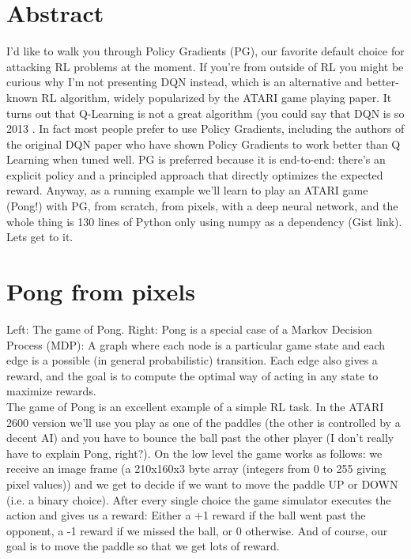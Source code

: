 \documentclass[14pt,a4paper]{report}  %
\begin{document}
\section{Abstract}
\qquad I'd like to walk you through Policy Gradients (PG), our favorite default choice for attacking RL problems at the moment. If you’re from outside of RL you might be curious why I’m not presenting DQN instead, which is an alternative and better-known RL algorithm, widely popularized by the ATARI game playing paper. It turns out that Q-Learning is not a great algorithm (you could say that DQN is so 2013 . In fact most people prefer to use Policy Gradients, including the authors of the original DQN paper who have shown Policy Gradients to work better than Q Learning when tuned well. PG is preferred because it is end-to-end: there's an explicit policy and a principled approach that directly optimizes the expected reward. Anyway, as a running example we'll learn to play an ATARI game (Pong!) with PG, from scratch, from pixels, with a deep neural network, and the whole thing is 130 lines of Python only using numpy as a dependency (Gist link). Lets get to it.

\section{Pong from pixels}
\qquad Left: The game of Pong. Right: Pong is a special case of a Markov Decision Process (MDP): A graph where each node is a particular game state and each edge is a possible (in general probabilistic) transition. Each edge also gives a reward, and the goal is to compute the optimal way of acting in any state to maximize rewards.\\ 
The game of Pong is an excellent example of a simple RL task. In the ATARI 2600 version we’ll use you play as one of the paddles (the other is controlled by a decent AI) and you have to bounce the ball past the other player (I don’t really have to explain Pong, right?). On the low level the game works as follows: we receive an image frame (a 210x160x3 byte array (integers from 0 to 255 giving pixel values)) and we get to decide if we want to move the paddle UP or DOWN (i.e. a binary choice). After every single choice the game simulator executes the action and gives us a reward: Either a +1 reward if the ball went past the opponent, a -1 reward if we missed the ball, or 0 otherwise. And of course, our goal is to move the paddle so that we get lots of reward.\\
\end{document}
